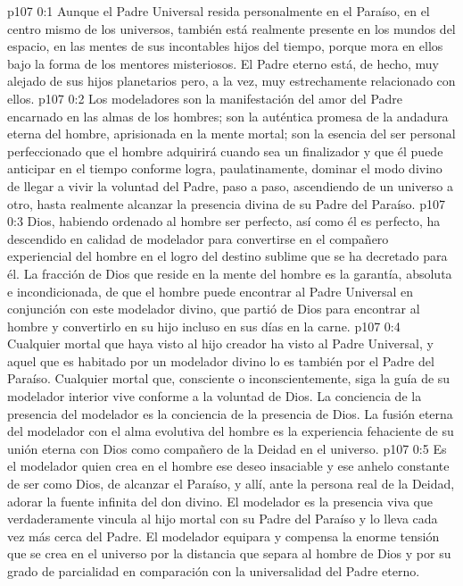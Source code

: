 \author{Mensajero solitario}
\vs p107 0:1 Aunque el Padre Universal resida personalmente en el Paraíso, en el centro mismo de los universos, también está realmente presente en los mundos del espacio, en las mentes de sus incontables hijos del tiempo, porque mora en ellos bajo la forma de los mentores misteriosos. El Padre eterno está, de hecho, muy alejado de sus hijos planetarios pero, a la vez, muy estrechamente relacionado con ellos.
\vs p107 0:2 Los modeladores son la manifestación del amor del Padre encarnado en las almas de los hombres; son la auténtica promesa de la andadura eterna del hombre, aprisionada en la mente mortal; son la esencia del ser personal perfeccionado que el hombre adquirirá cuando sea un finalizador y que él puede anticipar en el tiempo conforme logra, paulatinamente, dominar el modo divino de llegar a vivir la voluntad del Padre, paso a paso, ascendiendo de un universo a otro, hasta realmente alcanzar la presencia divina de su Padre del Paraíso.
\vs p107 0:3 Dios, habiendo ordenado al hombre ser perfecto, así como él es perfecto, ha descendido en calidad de modelador para convertirse en el compañero experiencial del hombre en el logro del destino sublime que se ha decretado para él. La fracción de Dios que reside en la mente del hombre es la garantía, absoluta e incondicionada, de que el hombre puede encontrar al Padre Universal en conjunción con este modelador divino, que partió de Dios para encontrar al hombre y convertirlo en su hijo incluso en sus días en la carne.
\vs p107 0:4 Cualquier mortal que haya visto al hijo creador ha visto al Padre Universal, y aquel que es habitado por un modelador divino lo es también por el Padre del Paraíso. Cualquier mortal que, consciente o inconscientemente, siga la guía de su modelador interior vive conforme a la voluntad de Dios. La conciencia de la presencia del modelador es la conciencia de la presencia de Dios. La fusión eterna del modelador con el alma evolutiva del hombre es la experiencia fehaciente de su unión eterna con Dios como compañero de la Deidad en el universo.
\vs p107 0:5 Es el modelador quien crea en el hombre ese deseo insaciable y ese anhelo constante de ser como Dios, de alcanzar el Paraíso, y allí, ante la persona real de la Deidad, adorar la fuente infinita del don divino. El modelador es la presencia viva que verdaderamente vincula al hijo mortal con su Padre del Paraíso y lo lleva cada vez más cerca del Padre. El modelador equipara y compensa la enorme tensión que se crea en el universo por la distancia que separa al hombre de Dios y por su grado de parcialidad en comparación con la universalidad del Padre eterno.
